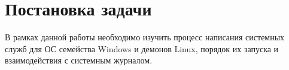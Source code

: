 \newpage
\section*{Постановка задачи}

\vspace{2em}

В рамках данной работы необходимо изучить процесс написания системных служб для ОС семейства Windows и демонов Linux, порядок их запуска и взаимодействия с системным журналом.